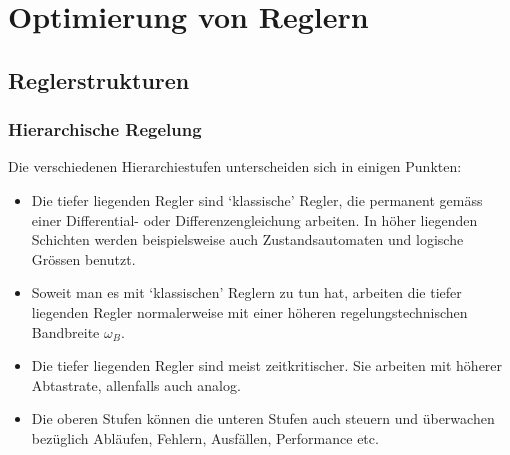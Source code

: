 \section{Optimierung von Reglern }
\subsection{Reglerstrukturen }
\subsubsection{Hierarchische Regelung }
Die verschiedenen Hierarchiestufen unterscheiden sich in einigen Punkten:
\begin{itemize}
	\item Die tiefer liegenden Regler sind ‘klassische’ Regler, die permanent gemäss einer
	Differential- oder Differenzengleichung arbeiten. In höher liegenden Schichten
	werden beispielsweise auch Zustandsautomaten und logische Grössen benutzt.
	\item Soweit man es mit ‘klassischen’ Reglern zu tun hat, arbeiten die tiefer liegenden
	Regler normalerweise mit einer höheren regelungstechnischen Bandbreite $\omega_B$.
	\item Die tiefer liegenden Regler sind meist zeitkritischer. Sie arbeiten mit höherer
	Abtastrate, allenfalls auch analog.
	\item Die oberen Stufen können die unteren Stufen auch steuern und überwachen
	bezüglich Abläufen, Fehlern, Ausfällen, Performance etc.
\end{itemize}

